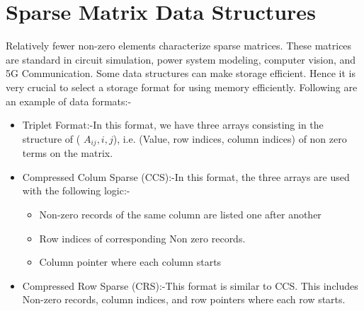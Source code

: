 \section{Sparse Matrix Data Structures}
Relatively fewer non-zero elements characterize sparse matrices. These matrices are standard in circuit simulation, power system modeling, computer vision, and 5G Communication. Some data structures can make storage efficient. Hence it is very crucial to select a storage format for using memory efficiently. Following are an example of data formats:-
\begin{itemize}
\item Triplet Format:-In this format, we have three arrays consisting in the structure of ( $A_{ij}, i, j $), i.e. (Value, row indices, column indices) of non zero terms on the matrix. 
\item Compressed Colum Sparse (CCS):-In this format, the three arrays are used with the following logic:-
\begin{itemize}
	\item Non-zero records of the same column are listed one after another
	\item Row indices of corresponding Non zero records.
	\item Column pointer where each column starts
\end{itemize}
\item Compressed Row Sparse (CRS):-This format is similar to CCS. This includes Non-zero records, column indices, and row pointers where each row starts.
\end{itemize}
